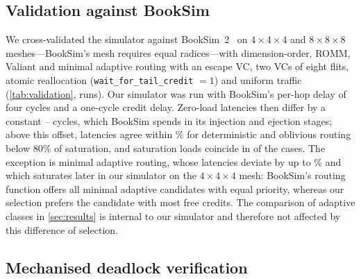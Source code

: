 \subsection{Validation against BookSim}
\label{sec:validation}

We cross-validated the simulator against BookSim~2~\cite{jiang2013booksim} on $4\times4\times4$ and $8\times8\times8$ meshes---BookSim's mesh requires equal radices---with dimension-order, ROMM, Valiant and minimal adaptive routing with an escape VC, two VCs of eight flits, atomic reallocation (\texttt{wait\_for\_tail\_credit} $=1$) and uniform traffic (\cref{tab:validation},  runs). Our simulator was run with BookSim's per-hop delay of four cycles and a one-cycle credit delay. Zero-load latencies then differ by a constant -- cycles, which BookSim spends in its injection and ejection stages; above this offset, latencies agree within \% for deterministic and oblivious routing below 80\% of saturation, and saturation loads coincide in  of the  cases. The exception is minimal adaptive routing, whose latencies deviate by up to \% and which saturates later in our simulator on the $4\times4\times4$ mesh: BookSim's routing function offers all minimal adaptive candidates with equal priority, whereas our selection prefers the candidate with most free credits. The comparison of adaptive classes in \cref{sec:results} is internal to our simulator and therefore not affected by this difference of selection.

\begin{table}[tbp]
\centering
\caption{Cross-validation against BookSim 2. Saturation load: highest offered load (flits/node/cycle) whose mean latency stays below three times the zero-load latency, applied identically to both simulators. Max.\ dev.: largest relative difference of offset-corrected latency below 80\% of saturation (--: no sweep point in that range).}
\label{tab:validation}
\small

\end{table}

\subsection{Mechanised deadlock verification}
\label{sec:checker}

